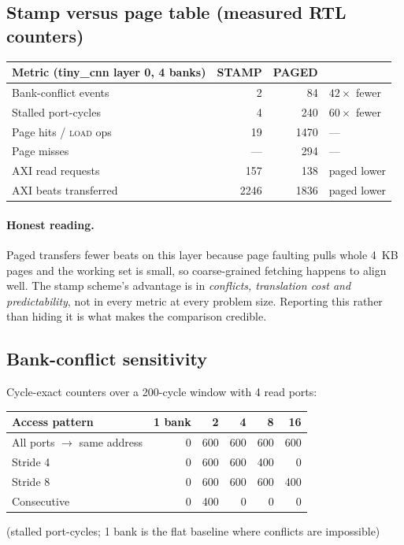 \documentclass[11pt,a4paper]{article}
\newcommand{\op}[1]{\textsc{#1}}
\begin{document}
\subsection{Stamp versus page table (measured RTL counters)}

\begin{center}
\small
\begin{tabular}{@{}lrrl@{}}
\toprule
\textbf{Metric (tiny\_cnn layer 0, 4 banks)} & \textbf{STAMP} & \textbf{PAGED} & \\
\midrule
Bank-conflict events        & 2    & 84   & $42\times$ fewer \\
Stalled port-cycles         & 4    & 240  & $60\times$ fewer \\
Page hits / \op{load} ops   & 19   & 1470 & --- \\
Page misses                 & ---  & 294  & --- \\
AXI read requests           & 157  & 138  & paged lower \\
AXI beats transferred       & 2246 & 1836 & paged lower \\
\bottomrule
\end{tabular}
\end{center}

\paragraph{Honest reading.} Paged transfers fewer beats on this layer because
page faulting pulls whole 4~KB pages and the working set is small, so
coarse-grained fetching happens to align well. The stamp scheme's advantage is
in \emph{conflicts, translation cost and predictability}, not in every metric at
every problem size. Reporting this rather than hiding it is what makes the
comparison credible.

\subsection{Bank-conflict sensitivity}
\label{tab:banksweep}

Cycle-exact counters over a 200-cycle window with 4 read ports:

\begin{center}
\small
\begin{tabular}{@{}lrrrrr@{}}
\toprule
\textbf{Access pattern} & \textbf{1 bank} & \textbf{2} & \textbf{4} & \textbf{8} & \textbf{16} \\
\midrule
All ports $\to$ same address & 0 & 600 & 600 & 600 & 600 \\
Stride 4                     & 0 & 600 & 600 & 400 & 0 \\
Stride 8                     & 0 & 600 & 600 & 600 & 400 \\
Consecutive                  & 0 & 400 & 0   & 0   & 0 \\
\bottomrule
\end{tabular}
\end{center}
\noindent(stalled port-cycles; 1 bank is the flat baseline where conflicts are impossible)
\end{document}
